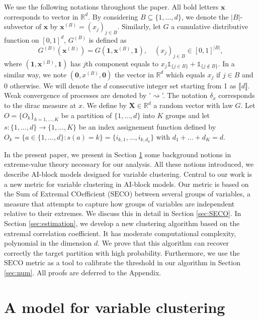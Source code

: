 \documentclass[11pt]{article}
\newcommand{\SECO}{\mathrm{SECO}}
\theoremstyle{definition}
\begin{document}
	We use the following notations throughout the paper. All bold letters $\textbf{x}$ corresponds to vector in $\mathbb{R}^d$. By considering $B \subseteq \{1,\dots,d\}$, we denote the $|B|$-subvector of $\textbf{x}$ by $\textbf{x}^{(B)} = (x_j)_{j \in B}$. Similarly, let $G$ a cumulative distributive function on $[0,1]^d$, $G^{(B)}$ is defined as
	\begin{equation*}
		G^{(B)}(\textbf{x}^{(B)}) = G(\textbf{1},\textbf{x}^{(B)}, \textbf{1}), \quad (x_j)_{j \in B} \in [0,1]^{|B|},
	\end{equation*}
	where $(\textbf{1},\textbf{x}^{(B)}, \textbf{1})$ has $j$th component equals to $x_j \mathds{1}_{\{j \in B\}} + \mathds{1}_{\{ j \notin B\}}$. In a similar way, we note $(\textbf{0}, x^{(B)}, \textbf{0})$ the vector in $\mathbb{R}^d$ which equals $x_j$ if $j \in B$ and $ 0 $ otherwise. We will denote the $d$ consecutive integer set starting from 1 as $\llbracket d \rrbracket$. Weak convergence of processes are denoted by '$\rightsquigarrow$'. The notation $\delta_x$ corresponds to the dirac measure at $x$. We define by $\textbf{X} \in \mathbb{R}^d$ a random vector with law $G$. Let $O = \{O_k\}_{k= 1 ,\dots, K}$ be a partition of $\{1,\dots,d\}$ into $K$ groups and let $s : \{1,\dots,d\} \rightarrow \{1,\dots,K\}$ be an index assignement function defined by $O_k = \{a \in \{1,\dots,d\} : s(a) = k\} = \{i_{k,1}, \dots, i_{k,d_k}\}$ with $d_1+\dots+d_K = d$.
	
	In the present paper, we present in Section \ref{sec:variable_clust} some background notions in extreme-value theory necessary for our analysis. All these notions introduced, we describe AI-block models designed for variable clustering. Central to our work is a new metric for variable clustering in AI-block models. Our metric is based on the Sum of Extremal COefficient ($\SECO$) between several groups of variables, a measure that attempts to capture how groups of variables are independent relative to their extremes. We discuss this in detail in Section \ref{sec:SECO}. In Section \ref{sec:estimation}, we develop a new clustering algorithm based on the extremal correlation coefficient. It has moderate computational complexity, polynomial in the dimension $d$. We prove that this algorithm can recover correctly the target partition with high probability. Furthermore, we use the $\SECO$ metric as a tool to calibrate the threshold in our algorithm in Section \ref{sec:num}. All proofs are deferred to the Appendix.
	
	\section{A model for variable clustering}
	\label{sec:variable_clust}
	
\end{document}
